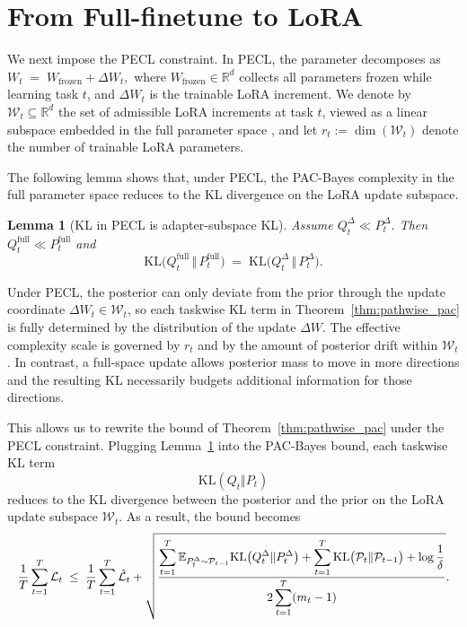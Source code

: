 \documentclass{article}
\theoremstyle{plain}
\newtheorem{lemma}[theorem]{Lemma}
\theoremstyle{definition}
\theoremstyle{remark}
\begin{document}
\section{From Full-finetune to LoRA}

We next impose the PECL constraint. In PECL, the parameter decomposes as
$
W_t \;=\; W_{\mathrm{frozen}} + \Delta W_t,
$
where $W_{\mathrm{frozen}}\in\mathbb{R}^d$ collects all parameters frozen while learning task $t$, and $\Delta W_t$ is the trainable LoRA increment. We denote by $\mathcal{W}_t \subseteq \mathbb{R}^d$ the set of admissible LoRA increments at task $t$, viewed as a linear subspace embedded in the full parameter space , and let $r_t:=\dim(\mathcal{W}_t)$ denote the number of trainable LoRA parameters.

 
The following lemma shows that, under PECL, the PAC-Bayes complexity in the full parameter space reduces to the KL divergence on the LoRA update subspace.
 
\begin{lemma}[KL in PECL is adapter-subspace KL]
\label{lem:kl-decomp-pecl}
Assume $Q_t^\Delta \ll P_t^\Delta$. Then $Q_t^{\mathrm{full}} \ll P_t^{\mathrm{full}}$ and
$$
\mathrm{KL}\bigl(Q_t^{\mathrm{full}} \,\Vert\, P_t^{\mathrm{full}}\bigr)
\;=\;
\mathrm{KL}\bigl(Q_t^\Delta \,\Vert\, P_t^\Delta\bigr).
$$
\end{lemma}
Under PECL, the posterior can only deviate from the prior through the update coordinate $\Delta W_t\in\mathcal W_t$, so each taskwise KL term in Theorem~\ref{thm:pathwise_pac} is fully determined by the distribution of the update $\Delta W$. The effective complexity scale is governed by $r_t$ and by the amount of posterior drift within $\mathcal W_t$. In contrast, a full-space update allows posterior mass to move in more directions and the resulting KL necessarily budgets additional information for those directions.

This allows us to rewrite the bound of Theorem~\ref{thm:pathwise_pac} under the PECL constraint. Plugging Lemma~\ref{lem:kl-decomp-pecl} into the PAC-Bayes bound, each taskwise KL term
\[
\mathrm{KL}(Q_t \Vert P_t)
\]
reduces to the KL divergence between the posterior and the prior on the LoRA update subspace $\mathcal W_t$. As a result, the bound becomes
\begin{equation}
\label{eq:pac-bayes-pecl}
\resizebox{\linewidth}{!}{$
\begin{aligned}
\frac{1}{T} \sum_{t=1}^T \mathcal L_t
\;\le\;
\frac{1}{T} \sum_{t=1}^T \hat{\mathcal L}_t
+
\sqrt{
\frac{
\displaystyle
\sum_{t=1}^T
\mathbb E_{P_t^\Delta\sim\mathcal P_{t-1}}
\mathrm{KL}\bigl(Q_t^\Delta \Vert P_t^\Delta\bigr)
+
\sum_{t=1}^T
\mathrm{KL}\bigl(\mathcal P_t\Vert\mathcal P_{t-1}\bigr)
+
\log\frac{1}{\delta}}
{2\displaystyle\sum_{t=1}^T (m_t - 1)}
}.
\end{aligned}
$}
\end{equation}
\end{document}
